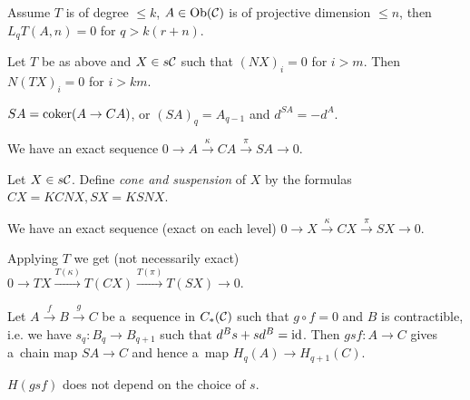 



    \begin{theorem}
        Assume $T$ is of degree $\leq k$, 
        $A \in \operatorname{Ob}(\mathcal{C})$ is of projective dimension $\leq n$,
        then $L_qT(A,n) = 0$ for $q > k(r+n)$.
    \end{theorem}
    
    \begin{lemma}
        Let $T$ be as above and $X \in s\mathcal{C}$ such that
        $(NX)_i = 0$ for $i>m$.
        Then $N(TX)_i = 0$ for $i>km$.
    \end{lemma}
    
    \begin{definition}[suspension]
        $SA = \operatorname{coker}(A \to CA)$,
        or $(SA)_q = A_{q-1}$ and $d^{SA} = - d^A$.
    \end{definition}
    
    \begin{corollary}
        We have an exact sequence
        $0 \to A \xrightarrow \kappa CA \xrightarrow \pi SA \to 0$.
    \end{corollary}
    
    \begin{definition}
        Let $X \in s\mathcal{C}$. 
        Define {\em cone and suspension} of $X$ by the formulas \\
        $CX = KCNX, SX = KSNX$.
    \end{definition}
    
    \begin{remark}
        We have an exact sequence (exact on each level)
        $0 \to X \xrightarrow \kappa CX \xrightarrow \pi SX \to 0$.
        
        Applying $T$ we get (not necessarily exact)
        $0 \to TX \xrightarrow{T(\kappa)} T(CX) \xrightarrow{T(\pi)}T(SX) \to 0$.
    \end{remark}
    
    \begin{remark}
        Let $A \xrightarrow f B \xrightarrow g C$ be a~sequence in $C_\ast(\mathcal{C})$
        such that $g \circ f = 0$ and $B$ is contractible,
        i.e. we have $s_q:B_q \to B_{q+1}$ such that $d^B s + sd^B = \mathrm{id}$.
        Then $gsf:A \to C$ gives a~chain map $SA \to C$
        and hence a~map $H_q(A) \to H_{q+1}(C)$.
    \end{remark}
    
    \begin{theorem}
        $H(gsf)$ does not depend on the choice of $s$.
    \end{theorem}
    
